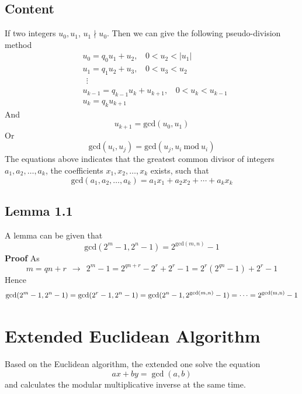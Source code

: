 \documentclass[11pt]{article}
\begin{document}
\subsection{Content}
If two integers $u_0, u_1$, $u_1 \nmid u_0$. Then we can give the following pseudo-division method
\begin{equation}
\begin{aligned}
    &u_0 = q_0u_1 + u_2,~~~~0 < u_2 < |u_1|\\
    &u_1 = q_1u_2 + u_3,~~~~0 < u_3 < u_2 \\
        &~~\vdots\\
    &u_{k-1} = q_{k-1}u_k + u_{k+1},~~~~0 < u_k < u_{k-1}\\
    &u_k = q_k u_{k+1}
\end{aligned}
\end{equation}
And
\begin{equation}
    u_{k+1} = \text{gcd}(u_0,u_1)
\end{equation}
Or
\begin{equation}
    \text{gcd}(u_i,u_j) = \text{gcd}(u_j, u_i~\text{mod}~u_i)
\end{equation}
The equations above indicates that the greatest common divisor of integers $a_1, a_2, \dots, a_k$, the coefficients $x_1, x_2, \dots, x_k$ exists, such that
\begin{equation}
    \text{gcd}(a_1,a_2,\dots,a_k) = a_1x_1+a_2x_2+\cdots+a_kx_k
\end{equation}
\subsection{Lemma 1.1}
A lemma can be given that
\begin{equation}
    \text{gcd}(2^m-1,2^n-1) = 2^{\text{gcd}(m,n)}-1
\end{equation}
\textbf{Proof} As
\begin{equation}
    m = qn + r~~\rightarrow~~2^{m}-1=2^{qn+r}-2^r+2^r-1=2^r(2^{qn}-1)+2^r-1
\end{equation}
Hence
\begin{equation}
    \text{gcd}(2^m-1,2^n-1) = \text{gcd}(2^r-1,2^n-1) = \text{gcd}(2^n-1,2^{\text{gcd}(m,n)}-1) = \cdots = 2^{\text{gcd(m,n)}}-1 \notag
\end{equation}
\section{Extended Euclidean Algorithm}
Based on the Euclidean algorithm, the extended one solve the equation 
\begin{equation}
    ax + by = \gcd(a,b)
\end{equation}
and calculates the modular multiplicative inverse at the same time. 
\end{document}
